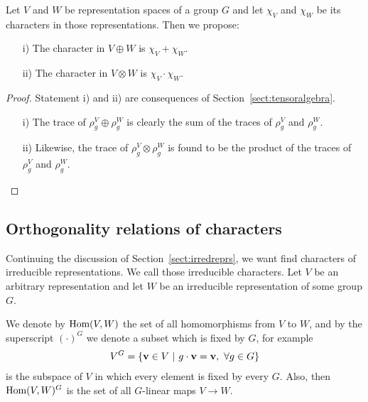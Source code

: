 \begin{proposition}\label{prop:charplustimes}
	Let $V$ and $W$ be representation spaces of a group $G$ and let $\chi_V$ and $\chi_W$ be its characters in those representations. Then we propose:
	\begin{enumerate}
		\item[i)] The character in $V \oplus W$ is $\chi_V+\chi_W$.
		\item[ii)] The character in $V \otimes W$ is $\chi_V \cdot \chi_W$.
	\end{enumerate}
\end{proposition}
\begin{proof}
	Statement i) and ii) are consequences of Section~\ref{sect:tensoralgebra}. 
	\begin{enumerate}
		\item[i)] The trace of $\rho_g^V \oplus \rho_g^W$ is clearly the sum of the traces of $\rho_g^V$ and $\rho_g^W$.
		\item[ii)] Likewise, the trace of $\rho_g^V \otimes \rho_g^W$ is found to be the product of the traces of $\rho_g^V$ and $\rho_g^W$.\qedhere
	\end{enumerate}
\end{proof}


\subsection{Orthogonality relations of characters}

Continuing the discussion of Section~\ref{sect:irredreprs}, we want find characters of irreducible representations. We call those irreducible characters. Let $V$ be an arbitrary representation and let $W$ be an irreducible representation of some group $G$. 

We denote by $\text{Hom} (V,W)$ the set of all homomorphisms from $V$ to $W$, and by the superscript $(\cdot) ^G$ we denote a subset which is fixed by $G$, for example 
\begin{align}\label{eq:defVG}
	V^G = \left\lbrace \mathbf{v} \in V \ \middle\vert \ g\cdot \mathbf{v} = \mathbf{v}, \ \forall g \in G \right\rbrace
\end{align} 
is the subspace of $V$ in which every element is fixed by every $G$. Also, then $\text{Hom}(V,W)^G$ is the set of all $G$-linear maps $V \rightarrow W$.

